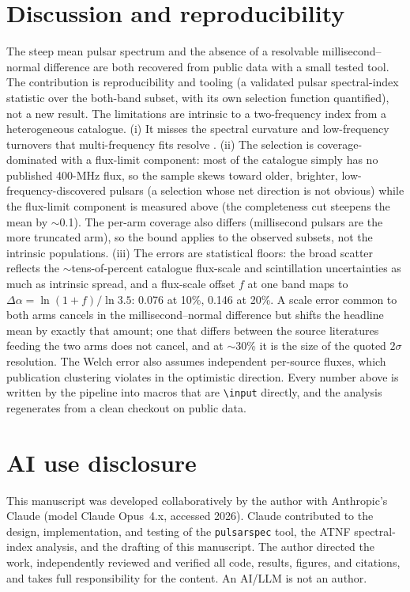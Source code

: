 \documentclass[twocolumn]{aastex631}
\newcommand{\code}[1]{\texttt{#1}}
\begin{document}
\section{Discussion and reproducibility}
The steep mean pulsar spectrum and the absence of a resolvable millisecond--normal difference are
both recovered from public data with a small tested tool. The contribution is reproducibility and
tooling (a validated pulsar spectral-index statistic over the both-band subset, with its own
selection function quantified), not a new result. The limitations are intrinsic to a two-frequency
index from a heterogeneous catalogue. (i) It misses the spectral curvature and low-frequency
turnovers that multi-frequency fits resolve \citep{jankowski2018}. (ii) The selection is
coverage-dominated with a flux-limit component: most of the catalogue simply has no published
400-MHz flux, so the sample skews toward older, brighter, low-frequency-discovered pulsars (a selection whose net direction is not obvious) while the flux-limit component is measured
above (the completeness cut steepens the mean by $\sim$0.1). The per-arm coverage also differs
(millisecond pulsars are the more truncated arm), so the bound applies to the observed subsets,
not the intrinsic populations. (iii) The errors are statistical floors: the broad scatter reflects
the $\sim$tens-of-percent catalogue flux-scale and scintillation uncertainties as much as
intrinsic spread, and a flux-scale offset $f$ at one band maps to $\Delta\alpha=\ln(1+f)/\ln 3.5$: 0.076 at 10\%, 0.146 at 20\%. A scale error common to both arms
cancels in the millisecond--normal difference but shifts the headline mean by exactly that amount;
one that differs between the source literatures feeding the two arms does not cancel, and at
$\sim$30\% it is the size of the quoted $2\sigma$ resolution. The Welch error also assumes
independent per-source fluxes, which publication clustering violates in the optimistic direction.
Every number above is written by the pipeline into macros that are \code{\textbackslash input}
directly, and the analysis regenerates from a clean checkout on public data.

\section*{AI use disclosure}
This manuscript was developed collaboratively by the author with Anthropic's Claude
\citep{anthropicclaude} (model Claude Opus~4.x, accessed 2026). Claude contributed to the design,
implementation, and testing of the \code{pulsarspec} tool, the ATNF spectral-index analysis, and the
drafting of this manuscript. The author directed the work, independently reviewed and verified all
code, results, figures, and citations, and takes full responsibility for the content. An AI/LLM is not
an author.
\end{document}
